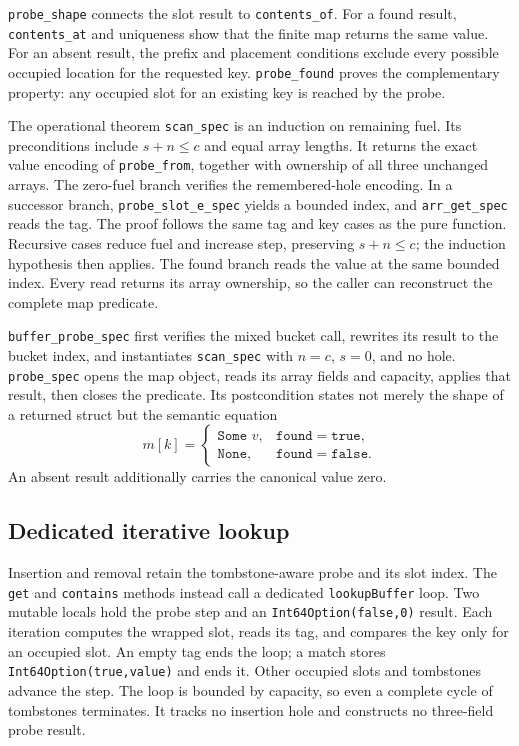 \documentclass[11pt]{article}
\begin{document}
\texttt{probe\_shape} connects the slot result to \texttt{contents\_of}.
For a found result, \texttt{contents\_at} and uniqueness show that the finite
map returns the same value. For an absent result, the prefix and placement
conditions exclude every possible occupied location for the requested key.
\texttt{probe\_found} proves the complementary property: any occupied slot for
an existing key is reached by the probe.

The operational theorem \texttt{scan\_spec} is an induction on remaining fuel.
Its preconditions include $s+n\leq c$ and equal array lengths. It returns the
exact value encoding of \texttt{probe\_from}, together with ownership of all
three unchanged arrays. The zero-fuel branch verifies the remembered-hole
encoding. In a successor branch, \texttt{probe\_slot\_e\_spec} yields a bounded
index, and \texttt{arr\_get\_spec} reads the tag. The proof follows the same tag
and key cases as the pure function. Recursive cases reduce fuel and increase
step, preserving $s+n\leq c$; the induction hypothesis then applies.
The found branch reads the value at the same bounded index. Every read returns
its array ownership, so the caller can reconstruct the complete map predicate.

\texttt{buffer\_probe\_spec} first verifies the mixed bucket call, rewrites its
result to the bucket index, and instantiates \texttt{scan\_spec} with
$n=c$, $s=0$, and no hole. \texttt{probe\_spec} opens the map object, reads its
array fields and capacity, applies that result, then closes the predicate.
Its postcondition states not merely the shape of a returned struct but the
semantic equation
\[
 m[k]=\begin{cases}\texttt{Some }v,&\texttt{found}=\texttt{true},\\
 \texttt{None},&\texttt{found}=\texttt{false}.
 \end{cases}
\]
An absent result additionally carries the canonical value zero.

\subsection{Dedicated iterative lookup}

Insertion and removal retain the tombstone-aware probe and its slot index.
The \texttt{get} and \texttt{contains} methods instead call a dedicated
\texttt{lookupBuffer} loop. Two mutable locals hold the probe step and an
\texttt{Int64Option(false,0)} result. Each iteration computes the wrapped
slot, reads its tag, and compares the key only for an occupied slot. An empty
tag ends the loop; a match stores \texttt{Int64Option(true,value)} and ends
it. Other occupied slots and tombstones advance the step. The loop is
bounded by capacity, so even a complete cycle of tombstones terminates.
It tracks no insertion hole and constructs no three-field probe result.
\end{document}
